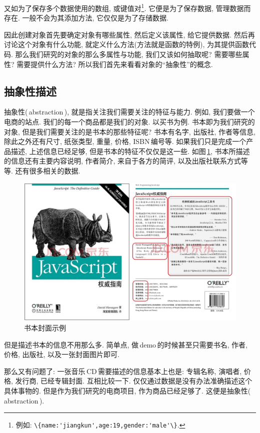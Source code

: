 又如为了保存多个数据使用的数组, 或键值对\footnote{例如: \lstinline|\{name:'jiangkun',age:19,gender:'male'\}|.}.
它便是为了保存数据, 管理数据而存在. 一般不会为其添加方法, 它仅仅是为了存储数据.

因此创建对象首先要确定对象有哪些属性, 然后定义该属性, 给它提供数据. 
然后再讨论这个对象有什么功能, 就定义什么方法(方法就是函数的特例), 为其提供函数代码.
那么我们研究的对象的那么多属性与功能, 我们又该如何抽取呢? 需要哪些属性? 需要提供什么方法? 
所以我们首先来看看对象的``抽象性''的概念.

\subsection{抽象性描述}

抽象性(\,abstraction\,), 就是指关注我们需要关注的特征与能力. 例如, 我们要做一个电商的站点.
我们的每一个商品都是我们的对象. 以买书为例. 书本即为我们研究的对象, 但是我们需要关注的是书本的那些特征呢?
书本有名字, 出版社, 作者等信息, 除此之外还有尺寸, 纸张类型, 重量, 价格, ISBN\,编号等.
如果我们只是完成一个产品描述, 上述信息已经足够, 但是书本的特征不仅仅是这一些. 如图\,\ref{ch02_0001}, 
书本所描述的信息还有主要内容说明, 作者简介, 来自于各方的简评, 以及出版社联系方式等等. 
还有很多相关的数据.

\begin{figure}[!htbp]
\centering
\noindent\includegraphics[width=\textwidth]{imgs/jsqwznv6.jpg}
\caption{书本封面示例\label{ch02_0001}}
\end{figure}

但是描述书本的信息不用那么多. 简单点, 做\,demo\,的时候甚至只需要书名, 作者, 价格, 出版社, 以及一张封面图片即可.

那么又有问题了: 一张音乐\,CD\,需要描述的信息基本上也是: 专辑名称, 演唱者, 价格, 发行商, 已经专辑封面. 互相比较一下. 
仅仅通过数据是没有办法准确描述这个具体事物的. 但是作为我们研究的电商项目, 作为商品已经足够了. 这便是抽象性(\,abstraction\,).

